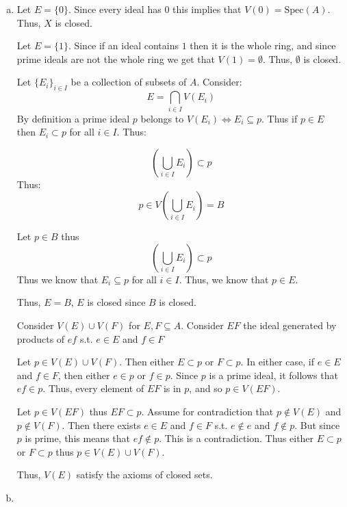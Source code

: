 \documentclass[12pt, letterpaper]{article}
\begin{document}
 \begin{enumerate}[(a)]
    \item Let $E=\{0\}$. Since every ideal has $0$ this implies that $V(0)=\text{Spec}(A)$. Thus, $X$ is closed.
    
    Let $E=\{1\}$. Since if an ideal contains $1$ then it is the whole ring, and since prime ideals are not the whole ring we get that $V(1)=\emptyset$. Thus, $\emptyset$ is closed.

    Let $\{E_i\}_{i\in I}$ be a collection of subsets of $A$. Consider:
    \[E=\bigcap_{i \in I} V(E_i)\]
    By definition a prime ideal $p$ belongs to $V(E_i) \iff E_i \subseteq p$. Thus if $p \in E$ then $E_i \subset p$ for all $i \in I$. Thus:

    \[\left( \bigcup_{i \in I} E_i \right) \subset p\]
    Thus:
    \[p \in V\left( \bigcup_{i \in I} E_i \right)=B\]

    Let $p \in B$ thus
    \[\left( \bigcup_{i \in I} E_i \right) \subset p\]
    Thus we know that $E_i \subseteq p$ for all $i \in I$. Thus, we know that $p \in E$.

    Thus, $E=B$, $E$ is closed since $B$ is closed.

    Consider $V(E) \cup V(F)$ for $E,F \subseteq A$. Consider $EF$ the ideal generated by products of $ef$ s.t. $e \in E$ and $f \in F$

    Let $p \in V(E) \cup V(F)$. Then either $E \subset p$ or $F \subset p$. In either case, if $e \in E$ and $f \in F$, then either $e \in p$ or $f \in p$. Since $p$ is a prime ideal, it follows that $ef \in p$. Thus, every element of $EF$ is in $p$, and so $p \in V(EF)$.

    Let $p \in V(EF)$ thus $EF \subset p$. Assume for contradiction that $p \notin V(E)$ and $p \notin V(F)$. Then there exists $e \in E$ and $f \in F$ s.t. $e \notin e$ and $f \notin p$. But since $p$ is prime, this means that $ef \notin p$. This is a contradiction. Thus either $E \subset p$ or $F \subset p$ thus $p \in V(E) \cup V(F)$.

    Thus, $V(E)$ satisfy the axioms of closed sets.

    \setcounter{enumi}{4}\item 
\end{enumerate}
\end{document}
